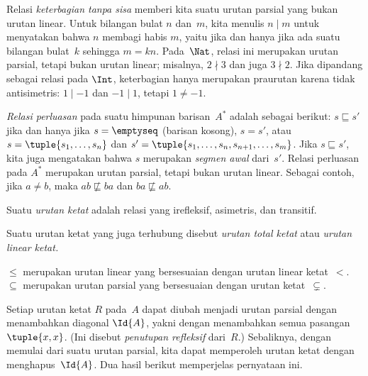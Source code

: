 \documentclass[../../../include/open-logic-section]{subfiles}
\begin{document}
\begin{ex}
Relasi \emph{keterbagian tanpa sisa} memberi kita suatu urutan parsial yang
bukan urutan linear. Untuk bilangan bulat $n$ dan~$m$, kita menulis $n \mid m$
untuk menyatakan bahwa $n$ membagi habis $m$, yaitu jika dan hanya jika ada
suatu bilangan bulat~$k$ sehingga $m = kn$. Pada~$\Nat$, relasi ini merupakan
urutan parsial, tetapi bukan urutan linear; misalnya, $2 \nmid 3$ dan juga
$3 \nmid 2$. Jika dipandang sebagai relasi pada $\Int$, keterbagian hanya
merupakan praurutan karena tidak antisimetris: $1 \mid -1$ dan $-1 \mid 1$,
tetapi $1 \neq -1$.
\end{ex}

\begin{ex}
\emph{Relasi perluasan} pada suatu himpunan barisan~$A^*$ adalah sebagai
berikut: $s \sqsubseteq s'$ jika dan hanya jika $s = \emptyseq$ (barisan
kosong), $s = s'$, atau $s = \tuple{s_1, \dots, s_n}$ dan
$s' = \tuple{s_1, \dots, s_n, s_{n+1}, \dots, s_m}$. Jika
$s \sqsubseteq s'$, kita juga mengatakan bahwa $s$ merupakan \emph{segmen
awal} dari~$s'$. Relasi perluasan pada $A^*$ merupakan urutan parsial, tetapi
bukan urutan linear. Sebagai contoh, jika $a \neq b$, maka
$ab \not\sqsubseteq ba$ dan $ba \not\sqsubseteq ab$.
\end{ex}

\begin{defn}
Suatu \emph{urutan ketat} adalah relasi yang irefleksif, asimetris, dan
transitif.
\end{defn}

\begin{defn}
Suatu urutan ketat yang juga terhubung disebut \emph{urutan total ketat} atau
\emph{urutan linear ketat.}
\end{defn}

\begin{ex}
$\le$ merupakan urutan linear yang bersesuaian dengan urutan linear
ketat~$<$. $\subseteq$ merupakan urutan parsial yang bersesuaian dengan
urutan ketat~$\subsetneq$.
\end{ex}

Setiap urutan ketat $R$ pada~$A$ dapat diubah menjadi urutan parsial dengan
menambahkan diagonal $\Id{A}$, yakni dengan menambahkan semua pasangan
$\tuple{x, x}$. (Ini disebut \emph{penutupan refleksif} dari~$R$.) Sebaliknya,
dengan memulai dari suatu urutan parsial, kita dapat memperoleh urutan ketat
dengan menghapus~$\Id{A}$. Dua hasil berikut memperjelas pernyataan ini.
\end{document}
